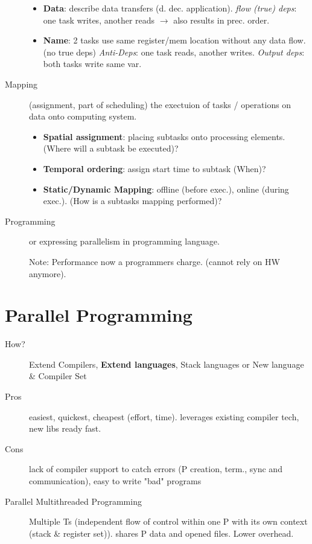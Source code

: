 \begin{description}
\begin{itemize}
            \item \textbf{Data}: describe data transfers (d. dec. application). \textit{flow (true) deps}: one task writes, another reads $\rightarrow$ also results in prec. order.
            \item \textbf{Name}: 2 tasks use same register/mem location without any data flow. (no true deps) \textit{Anti-Deps}: one task reads, another writes. \textit{Output deps}: both tasks write same var.
        \end{itemize}
        \item[Mapping] (assignment, part of scheduling) the exectuion of tasks / operations on data onto computing system.
        \begin{itemize}
            \item \textbf{Spatial assignment}: placing subtasks onto processing elements. (Where will a subtask be executed)?
            \item \textbf{Temporal ordering}: assign start time to subtask (When)?
            \item \textbf{Static/Dynamic Mapping}: offline (before exec.), online (during exec.). (How is a subtasks mapping performed)?
        \end{itemize}
        \item[Programming] or expressing parallelism in programming language.
        \item[] Note: Performance now a programmers charge. (cannot rely on HW anymore).
\end{description}
\section*{Parallel Programming}
\begin{description}
    \item[How?] Extend Compilers, \textbf{Extend languages}, Stack languages or New language \& Compiler Set
    \item[Pros] easiest, quickest, cheapest (effort, time). leverages existing compiler tech, new libs ready fast.
    \item[Cons] lack of compiler support to catch errors (P creation, term., sync and communication), easy to write "bad" programs
    \item[Parallel Multithreaded Programming]Multiple Ts (independent flow of control within one P with its own context (stack \& register set)). shares P data and opened files. Lower overhead. %
\end{description}
